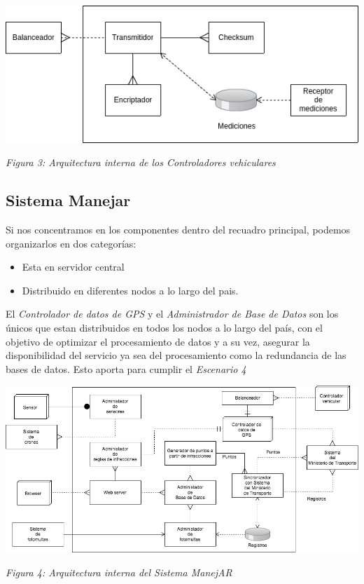 \centerline{\includegraphics[width=1\textwidth]{./imagenes/arquitectura_tp2/controlador_vehicular.png}}
\centerline{\textit{Figura 3: Arquitectura interna de los Controladores vehiculares}}


\subsection{Sistema Manejar}

Si nos concentramos en los componentes dentro del recuadro principal, podemos 
organizarlos en dos categorías:

\begin{itemize}
  \item Esta en servidor central
  \item Distribuido en diferentes nodos a lo largo del pais.  
\end{itemize}


El \textit{Controlador de datos de GPS} y el \textit{Administrador de Base de Datos} 
son los únicos que estan distribuidos en todos los nodos a lo largo del país, 
con el objetivo de optimizar el procesamiento de datos y a su vez, asegurar la 
disponibilidad del servicio ya sea del procesamiento como la redundancia de las bases de datos.
Esto aporta para cumplir el \textit{Escenario 4}


\centerline{\includegraphics[width=1\textwidth]{./imagenes/arquitectura_tp2/manejar.png}}
\centerline{\textit{Figura 4: Arquitectura interna del Sistema ManejAR}}


